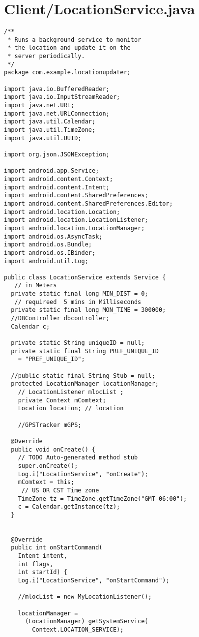\documentclass[conference]{IEEEtran}
\begin{document}
\section{Client/LocationService.java}
\begin{lstlisting}
/**
 * Runs a background service to monitor
 * the location and update it on the
 * server periodically.
 */
package com.example.locationupdater;

import java.io.BufferedReader;
import java.io.InputStreamReader;
import java.net.URL;
import java.net.URLConnection;
import java.util.Calendar;
import java.util.TimeZone;
import java.util.UUID;

import org.json.JSONException;

import android.app.Service;
import android.content.Context;
import android.content.Intent;
import android.content.SharedPreferences;
import android.content.SharedPreferences.Editor;
import android.location.Location;
import android.location.LocationListener;
import android.location.LocationManager;
import android.os.AsyncTask;
import android.os.Bundle;
import android.os.IBinder;
import android.util.Log;

public class LocationService extends Service {
   // in Meters
  private static final long MIN_DIST = 0;
   // requireed  5 mins in Milliseconds
  private static final long MON_TIME = 300000;
  //DBController dbcontroller;
  Calendar c;
  
  private static String uniqueID = null;
  private static final String PREF_UNIQUE_ID 
    = "PREF_UNIQUE_ID";
  
  //public static final String Stub = null;
  protected LocationManager locationManager;
    // LocationListener mlocList ;
    private Context mComtext;
    Location location; // location
    
    //GPSTracker mGPS;
    
  @Override
  public void onCreate() {
    // TODO Auto-generated method stub
    super.onCreate();
    Log.i("LocationService", "onCreate");
    mComtext = this;
     // US OR CST Time zone
    TimeZone tz = TimeZone.getTimeZone("GMT-06:00");
    c = Calendar.getInstance(tz);
  }
  
  
  @Override
  public int onStartCommand(
    Intent intent, 
    int flags, 
    int startId) {
    Log.i("LocationService", "onStartCommand");
    
    //mlocList = new MyLocationListener();
        
    locationManager = 
      (LocationManager) getSystemService(
        Context.LOCATION_SERVICE);
        

\end{lstlisting}
\end{document}
